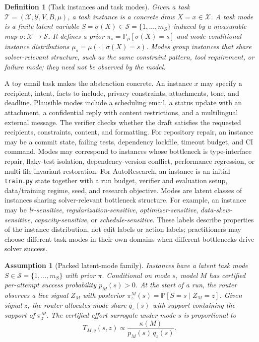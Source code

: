 \documentclass{article}
\newtheorem{assumption}{Assumption}
\newtheorem{definition}{Definition}
\newcommand{\cS}{\mathcal{S}}
\newcommand{\cT}{\mathcal{T}}
\newcommand{\cX}{\mathcal{X}}
\newcommand{\cY}{\mathcal{Y}}
\newcommand{\Prb}{\mathbb{P}}
\begin{document}
\begin{definition}[Task instances and task modes]
\label{def:modes}
Given a task $\cT=(\cX,\cY,V,B,\mu)$, a \emph{task instance} is a concrete draw $X=x\in\cX$.
A \emph{task mode} is a finite latent variable $S=\sigma(X)\in\cS=\{1,\ldots,m_S\}$ induced by a measurable map $\sigma:\cX\to\cS$.
It defines a prior $\pi_s=\Prb_\mu[\sigma(X)=s]$ and mode-conditional instance distributions $\mu_s=\mu(\cdot\mid\sigma(X)=s)$.
Modes group instances that share solver-relevant structure, such as the same constraint pattern, tool requirement, or failure mode; they need not be observed by the model.
\end{definition}

A toy email task makes the abstraction concrete.
An instance $x$ may specify a recipient, intent, facts to include, privacy constraints, attachments, tone, and deadline.
Plausible modes include a scheduling email, a status update with an attachment, a confidential reply with content restrictions, and a multilingual external message.
The verifier checks whether the draft satisfies the requested recipients, constraints, content, and formatting.
For repository repair, an instance may be a commit state, failing tests, dependency lockfile, timeout budget, and CI command.
Modes may correspond to instances whose bottleneck is type-interface repair, flaky-test isolation, dependency-version conflict, performance regression, or multi-file invariant restoration.
For AutoResearch, an instance is an initial \texttt{train.py} state together with a run budget, verifier and evaluation setup, data/training regime, seed, and research objective.
Modes are latent classes of instances sharing solver-relevant bottleneck structure.
For example, an instance may be \emph{lr-sensitive}, \emph{regularization-sensitive}, \emph{optimizer-sensitive}, \emph{data-skew-sensitive}, \emph{capacity-sensitive}, or \emph{schedule-sensitive}.
These labels describe properties of the instance distribution, not edit labels or action labels; practitioners may choose different task modes in their own domains when different bottlenecks drive solver success.

\begin{assumption}[Packed latent-mode family]
\label{ass:packed}
Instances have a latent task mode $S\in\cS=\{1,\ldots,m_S\}$ with prior $\pi$.
Conditional on mode $s$, model $M$ has certified per-attempt success probability $p_M(s)>0$.
At the start of a run, the router observes a live signal $Z_M$ with posterior
$\pi_z^M(s)=\Prb[S=s\mid Z_M=z]$.
Given signal $z$, the router allocates mode share $q_z(s)$ with support containing the support of $\pi_z^M$.
The certified effort surrogate under mode $s$ is proportional to
\begin{equation}
  T_{M,q}(s,z) \propto \frac{\kappa(M)}{p_M(s)\,q_z(s)} .
  \label{eq:effort-surrogate}
\end{equation}
\end{assumption}
\end{document}
